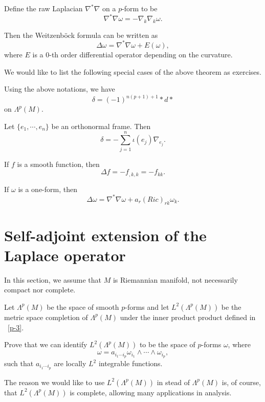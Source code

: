Define the raw Laplacian $\nabla^*\nabla$  on a $p$-form to be
\[
\nabla^*\nabla\omega=-\nabla_k\nabla_k\omega.
\]

Then the Weitzenb\"ock formula can be written as
\[
\Delta\omega=\nabla^*\nabla\omega+E(\omega),
\]
where $E$ is a $0$-th order differential operator depending on the curvature.


We would like to list the following special cases of the above theorem as exercises.


\begin{ex}
Using the above notations, we have
\[
\delta=(-1)^{n(p+1)+1}*d*
\]
on $\Lambda^p(M)$.
\end{ex}

\begin{ex} Let $\{e_1,\cdots, e_n\}$ be an orthonormal frame. Then
\[
\delta=-\sum_{j=1}^n\iota(e_j)\nabla_{e_j}.
\]
\end{ex}


\begin{ex} If $f$ is a smooth function, then
\[
\Delta f=-f_{,k,k}=-f_{kk}.
\]
\end{ex}

\begin{ex} If $\omega$ is a one-form, then
\[
\Delta\omega=\nabla^*\nabla\omega+a_r(Ric)_{rk}\omega_k.
\]
\end{ex}



\section{Self-adjoint extension of the Laplace operator}
In this section, we assume that $M$ is Riemannian manifold, not necessarily compact nor complete. 

Let $\Lambda^p(M)$ be the space of smooth $p$-forms and 
let $L^2(\Lambda^p(M))$ be the metric space completion of $\Lambda^p(M)$ under the inner product product defined in ~\eqref{p-3}. 

\begin{ex}
Prove that we can identify $L^2(\Lambda^p(M))$ to be the space of $p$-forms $\omega$, where
\[
\omega=a_{i_1\cdots i_p}\omega_{i_1}\wedge\cdots\wedge\omega_{i_p},
\]
such that $a_{i_1\cdots i_p}$ are locally $L^2$ integrable functions.
\end{ex}

The reason we would like to use $L^2(\Lambda^p(M))$ in stead of $\Lambda^p(M)$ is, of course, that 
$L^2(\Lambda^p(M))$ is complete, allowing many applications in analysis.

